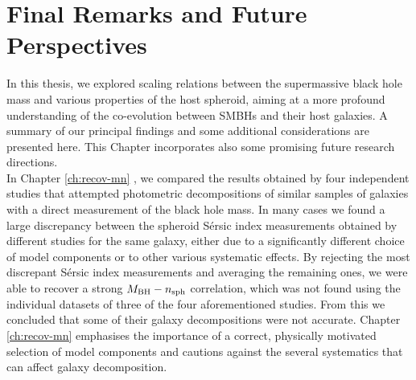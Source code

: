 \chapter{Final Remarks and Future Perspectives}
\label{ch:concl}

In this thesis, we explored scaling relations between the supermassive black hole mass 
and various properties of the host spheroid, 
aiming at a more profound understanding of the co-evolution between SMBHs and their host galaxies. 
A summary of our principal findings and some additional considerations are presented here. 
This Chapter incorporates also some promising future research directions. \\

In Chapter \ref{ch:recov-mn} \citep{savorgnan2013}, we compared the results obtained by four independent studies 
\citep{grahamdriver2007,sani2011,vika2012,beifiori2012}
that attempted photometric decompositions of similar samples of galaxies with a direct measurement 
of the black hole mass. 
In many cases we found a large discrepancy between the spheroid S\'ersic index measurements 
obtained by different studies for the same galaxy, 
either due to a significantly different choice of model components 
or to other various systematic effects. 
By rejecting the most discrepant S\'ersic index measurements and averaging the remaining ones, 
we were able to recover a strong $M_{\rm BH} - n_{\rm sph}$ correlation, 
which was not found using the individual datasets of three of the four aforementioned studies. 
From this we concluded that some of their galaxy decompositions were not accurate. 
Chapter \ref{ch:recov-mn} emphasises the importance of a correct, physically motivated selection of model components 
and cautions against the several systematics that can affect galaxy decomposition. \\

